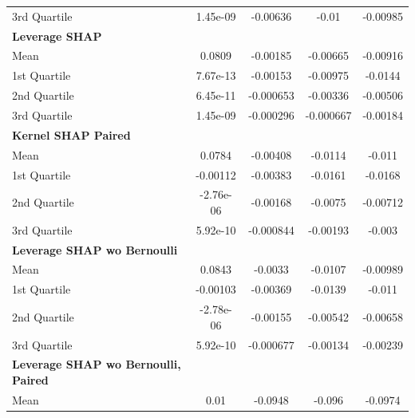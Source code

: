 {\begin{tabular} {lcccc}
\hspace{7pt}3rd Quartile & 1.45e-09 & -0.00636 & -0.01 & -0.00985 \\ 
\addlinespace[1ex] 
\textbf{Leverage SHAP} &  &  &  &  \\ 
\hspace{7pt}Mean & 0.0809 & -0.00185 & -0.00665 & -0.00916 \\ 
\hspace{7pt}1st Quartile & 7.67e-13 & -0.00153 & -0.00975 & -0.0144 \\ 
\hspace{7pt}2nd Quartile & 6.45e-11 & -0.000653 & -0.00336 & -0.00506 \\ 
\hspace{7pt}3rd Quartile & 1.45e-09 & -0.000296 & -0.000667 & -0.00184 \\ 
\addlinespace[1ex] 
\textbf{Kernel SHAP Paired} &  &  &  &  \\ 
\hspace{7pt}Mean & 0.0784 & -0.00408 & -0.0114 & -0.011 \\ 
\hspace{7pt}1st Quartile & -0.00112 & -0.00383 & -0.0161 & -0.0168 \\ 
\hspace{7pt}2nd Quartile & -2.76e-06 & -0.00168 & -0.0075 & -0.00712 \\ 
\hspace{7pt}3rd Quartile & 5.92e-10 & -0.000844 & -0.00193 & -0.003 \\ 
\addlinespace[1ex] 
\textbf{Leverage SHAP wo Bernoulli} &  &  &  &  \\ 
\hspace{7pt}Mean & 0.0843 & -0.0033 & -0.0107 & -0.00989 \\ 
\hspace{7pt}1st Quartile & -0.00103 & -0.00369 & -0.0139 & -0.011 \\ 
\hspace{7pt}2nd Quartile & -2.78e-06 & -0.00155 & -0.00542 & -0.00658 \\ 
\hspace{7pt}3rd Quartile & \cellcolor{bronze!60}5.92e-10 & -0.000677 & -0.00134 & -0.00239 \\ 
\addlinespace[1ex] 
\textbf{Leverage SHAP wo Bernoulli, Paired} &  &  &  &  \\ 
\hspace{7pt}Mean & \cellcolor{bronze!60}0.01 & \cellcolor{bronze!60}-0.0948 & \cellcolor{bronze!60}-0.096 & \cellcolor{bronze!60}-0.0974 \\ 

\end{tabular}}
